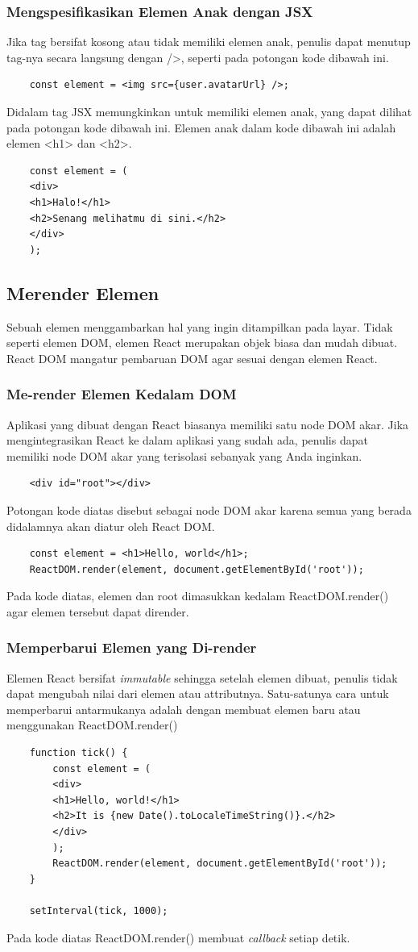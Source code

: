 \subsubsection{Mengspesifikasikan Elemen Anak dengan JSX}
Jika tag bersifat kosong atau tidak memiliki elemen anak, penulis dapat menutup tag-nya secara langsung dengan />, seperti pada potongan kode dibawah ini.
\begin{lstlisting}
	const element = <img src={user.avatarUrl} />;
\end{lstlisting}
Didalam tag JSX memungkinkan untuk memiliki elemen anak, yang dapat dilihat pada potongan kode dibawah ini. Elemen anak dalam kode dibawah ini adalah elemen <h1> dan <h2>.
\begin{lstlisting}
	const element = (
	<div>
	<h1>Halo!</h1>
	<h2>Senang melihatmu di sini.</h2>
	</div>
	);
\end{lstlisting}

\subsection{Merender Elemen}
Sebuah elemen menggambarkan hal yang ingin ditampilkan pada layar. Tidak seperti elemen DOM, elemen React merupakan objek biasa dan mudah dibuat. React DOM mangatur pembaruan DOM agar sesuai dengan elemen React.
\subsubsection{Me-render Elemen Kedalam DOM}
Aplikasi yang dibuat dengan React biasanya memiliki satu node DOM akar. Jika mengintegrasikan React ke dalam aplikasi yang sudah ada, penulis dapat memiliki node DOM akar yang terisolasi sebanyak yang Anda inginkan.
\begin{lstlisting}
	<div id="root"></div>
\end{lstlisting}
Potongan kode diatas disebut sebagai node DOM akar karena semua yang berada didalamnya akan diatur oleh React DOM.
\begin{lstlisting}
	const element = <h1>Hello, world</h1>;
	ReactDOM.render(element, document.getElementById('root'));
\end{lstlisting}
Pada kode diatas, elemen dan root dimasukkan kedalam ReactDOM.render() agar elemen tersebut dapat dirender.
\subsubsection{Memperbarui Elemen yang Di-render}
Elemen React bersifat \textit{immutable} sehingga setelah elemen dibuat, penulis tidak dapat mengubah nilai dari elemen atau attributnya. Satu-satunya cara untuk memperbarui antarmukanya adalah dengan membuat elemen baru atau menggunakan ReactDOM.render()
\begin{lstlisting}
	function tick() {
		const element = (
		<div>
		<h1>Hello, world!</h1>
		<h2>It is {new Date().toLocaleTimeString()}.</h2>
		</div>
		);
		ReactDOM.render(element, document.getElementById('root'));
	}
	
	setInterval(tick, 1000);
\end{lstlisting}
Pada kode diatas ReactDOM.render() membuat \textit{callback} setiap detik.

